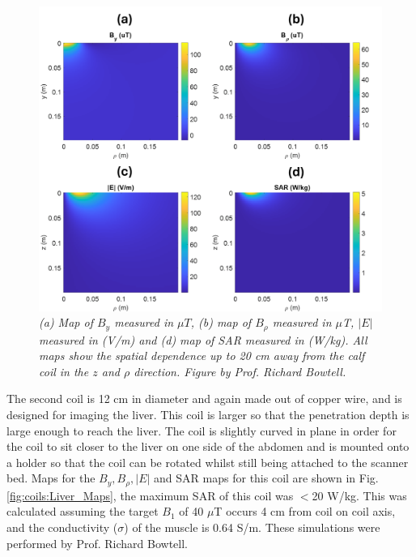 \begin{figure}[H]
    \centering
    \includegraphics[width=0.8\linewidth]{Figures/Coils/Calf_Maps.png}
    \caption{\textit{(a) Map of $B_y$ measured in $\mu T$, (b) map of $B_\rho$ measured in $\mu$T, $|E|$ measured in (V/m) and (d) map of \ac{SAR} measured in (W/kg). All maps show the spatial dependence up to 20 cm away from the calf coil in the $z$ and $\rho$ direction. Figure by Prof. Richard Bowtell.}}
    \label{fig:coils:Calf_Maps}
\end{figure}

The second coil is 12 cm in diameter and again made out of copper wire, and is designed for imaging the liver. This coil is larger so that the penetration depth is large enough to reach the liver. The coil is slightly curved in plane in order for the coil to sit closer to the liver on one side of the abdomen and is mounted onto a holder so that the coil can be rotated whilst still being attached to the scanner bed. Maps for the $B_y, B_\rho, |E|$ and \ac{SAR} maps for this coil are shown in Fig. \ref{fig:coils:Liver_Maps}, the maximum \ac{SAR} of this coil was $<$20 W/kg. This was calculated assuming the target $B_1$ of 40 $\mu$T occurs 4 cm from coil on coil axis, and the conductivity ($\sigma$) of the muscle is 0.64 S/m. These simulations were performed by Prof. Richard Bowtell.

